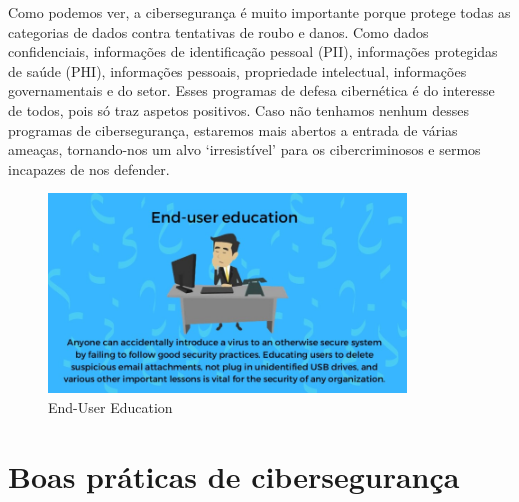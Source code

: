 \documentclass{report}
\begin{document}
{	Como podemos ver, a cibersegurança é muito importante porque protege todas as categorias de dados contra tentativas de roubo e danos. Como dados confidenciais, informações de identificação pessoal (PII), informações protegidas de saúde (PHI), informações pessoais, propriedade intelectual, informações governamentais e do setor. Esses programas de defesa cibernética é do interesse de todos, pois só traz aspetos positivos. Caso não tenhamos nenhum desses programas de cibersegurança, estaremos mais abertos a entrada de várias ameaças, tornando-nos um alvo ‘irresistível’ para os cibercriminosos e sermos incapazes de nos defender.
\begin{figure}[hp]
    \center 
    \includegraphics[height=150pt]{end-usereducation.PNG}
    \caption{End-User Education}
\label{fig:Figura3logo.1}
\end{figure}
	}


\clearpage

 \section{Boas práticas de cibersegurança}
\end{document}
